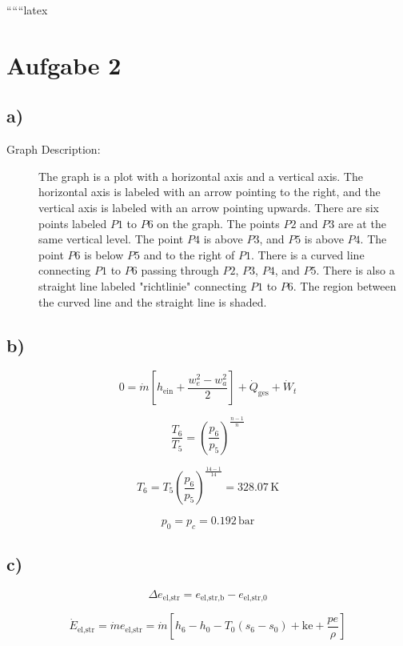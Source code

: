 
``````latex


\section*{Aufgabe 2}

\subsection*{a)}

\begin{description}
    \item[Graph Description:] The graph is a plot with a horizontal axis and a vertical axis. The horizontal axis is labeled with an arrow pointing to the right, and the vertical axis is labeled with an arrow pointing upwards. There are six points labeled \( P1 \) to \( P6 \) on the graph. The points \( P2 \) and \( P3 \) are at the same vertical level. The point \( P4 \) is above \( P3 \), and \( P5 \) is above \( P4 \). The point \( P6 \) is below \( P5 \) and to the right of \( P1 \). There is a curved line connecting \( P1 \) to \( P6 \) passing through \( P2 \), \( P3 \), \( P4 \), and \( P5 \). There is also a straight line labeled "richtlinie" connecting \( P1 \) to \( P6 \). The region between the curved line and the straight line is shaded.
\end{description}

\subsection*{b)}

\[
0 = \dot{m} \left[ h_{\text{ein}} + \frac{w_e^2 - w_a^2}{2} \right] + \dot{Q}_{\text{ges}} + \dot{W}_t
\]

\[
\frac{T_6}{T_5} = \left( \frac{p_6}{p_5} \right)^{\frac{n-1}{n}}
\]

\[
T_6 = T_5 \left( \frac{p_6}{p_5} \right)^{\frac{14-1}{14}} = 328.07 \, \text{K}
\]

\[
p_0 = p_c = 0.192 \, \text{bar}
\]

\subsection*{c)}

\[
\Delta e_{\text{el,str}} = e_{\text{el,str,b}} - e_{\text{el,str,0}}
\]

\[
\dot{E}_{\text{el,str}} = \dot{m} e_{\text{el,str}} = \dot{m} \left[ h_6 - h_0 - T_0 (s_6 - s_0) + \text{ke} + \frac{p e}{\rho} \right]
\]

